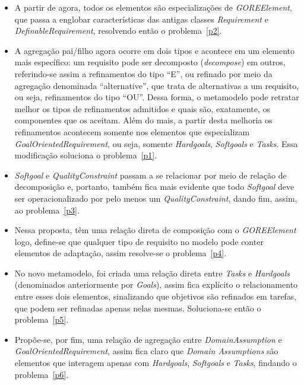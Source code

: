 \begin{itemize}
	\item A partir de agora, todos os elementos são especializações de \textit{GOREElement}, que passa a englobar características das antigas classes \textit{Requirement} e \textit{DefinableRequirement}, resolvendo então o problema~\ref{p2}. 

	\item A agregação pai/filho agora ocorre em dois tipos e acontece em um elemento mais específico: um requisito pode ser decomposto (\textit{decompose}) em outros, referindo-se assim a refinamentos do tipo ``E'', ou refinado por meio da agregação denominada ``alternative'', que trata de alternativas a um requisito, ou seja, refinamentos do tipo ``OU''. Dessa forma, o metamodelo pode retratar melhor os tipos de refinamentos admitidos e quais são, exatamente, os componentes que  os aceitam. Além do mais, a partir desta melhoria os refinamentos acontecem somente nos elementos que especializam \textit{GoalOrientedRequirement}, ou seja, somente \textit{Hardgoals}, \textit{Softgoals} e \textit{Tasks}. Essa modificação soluciona o problema~\ref{p1}.
	
	\item \textit{Softgoal} e \textit{QualityConstraint} passam a se relacionar por meio de relação de decomposição e, portanto, também fica mais evidente que todo \textit{Softgoal} deve ser operacionalizado por pelo menos um \textit{QualityConstraint}, dando fim, assim, ao problema~\ref{p3}.
	
	\item Nessa proposta, \awreqs têm uma relação direta de composição com o \textit{GOREElement} logo, define-se que qualquer tipo de requisito no modelo pode conter elementos de adaptação, assim resolve-se o problema~\ref{p4}.
	
	\item No novo metamodelo, foi criada uma relação direta entre \textit{Tasks} e \textit{Hardgoals} (denominados anteriormente por \textit{Goals}), assim fica explícito o relacionamento entre esses dois elementos, sinalizando que objetivos são refinados em tarefas, que podem ser refinadas apenas nelas mesmas. Soluciona-se então o problema~\ref{p5}.
	
	\item Propõe-se, por fim, uma relação de agregação entre \textit{DomainAssumption} e \textit{GoalOrientedRequirement}, assim fica claro que \textit{Domain Assumptions} são elementos que interagem apenas com \textit{Hardgoals}, \textit{Softgoals} e \textit{Tasks}, findando o problema~\ref{p6}.
	
\end{itemize}

